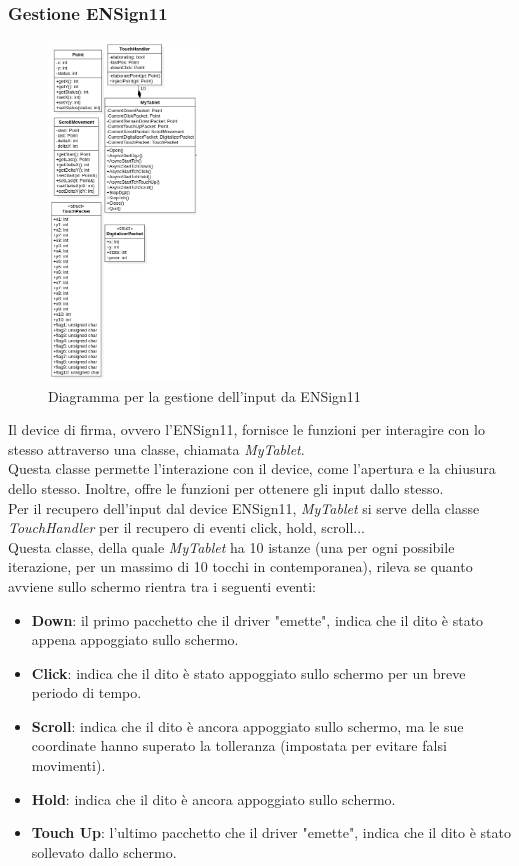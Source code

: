 \subsubsection{Gestione ENSign11}
\begin{figure}[h]
    \centering
    \includegraphics[width=115pt]{images/prog/ENS11.png}
    \caption{Diagramma per la gestione dell'input da ENSign11}
    \label{fig:es11}
\end{figure}
Il device di firma, ovvero l'ENSign11, fornisce le funzioni per interagire con lo stesso attraverso una classe, chiamata \emph{MyTablet}.\\
Questa classe permette l'interazione con il device, come l'apertura e la chiusura dello stesso. Inoltre, offre le funzioni per ottenere gli input dallo stesso.\\
Per il recupero dell'input dal device ENSign11, \emph{MyTablet} si serve della classe \emph{TouchHandler} per il recupero di eventi click, hold, scroll...\\
Questa classe, della quale \emph{MyTablet} ha 10 istanze (una per ogni possibile iterazione, per un massimo di 10 tocchi in contemporanea), rileva se quanto avviene sullo schermo rientra tra i seguenti eventi:
\begin{itemize}
    \item \textbf{Down}: il primo pacchetto che il driver "emette", indica che il dito è stato appena appoggiato sullo schermo.
    \item \textbf{Click}: indica che il dito è stato appoggiato sullo schermo per un breve periodo di tempo.
    \item \textbf{Scroll}: indica che il dito è ancora appoggiato sullo schermo, ma le sue coordinate hanno superato la tolleranza (impostata per evitare falsi movimenti).
    \item \textbf{Hold}: indica che il dito è ancora appoggiato sullo schermo.
    \item \textbf{Touch Up}: l'ultimo pacchetto che il driver "emette", indica che il dito è stato sollevato dallo schermo.
\end{itemize}
